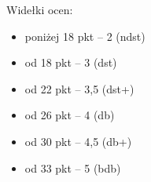 \documentclass[12pt]{report}
\begin{document}
Widełki ocen:
\begin{itemize}
\item poniżej 18 pkt -- 2 (ndst)
\item od 18 pkt -- 3 (dst)
\item od 22 pkt -- 3,5 (dst+)
\item od 26 pkt -- 4 (db)
\item od 30 pkt -- 4,5 (db+)
\item od 33 pkt -- 5 (bdb)
\end{itemize}
\end{document}
